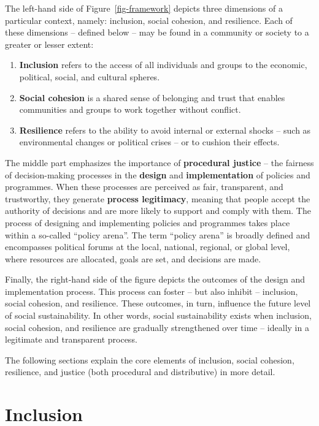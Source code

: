 \documentclass[
  a4paper,
  DIV=11,
  numbers=noendperiod,
  oneside,
  openany]{scrreprt}
\begin{document}
The left-hand side of Figure~\ref{fig-framework} depicts three
dimensions of a particular context, namely: inclusion, social cohesion,
and resilience. Each of these dimensions -- defined below -- may be
found in a community or society to a greater or lesser extent:

\begin{enumerate}
\def\labelenumi{\arabic{enumi}.}
\item
  \textbf{Inclusion} refers to the access of all individuals and groups
  to the economic, political, social, and cultural spheres.
\item
  \textbf{Social cohesion} is a shared sense of belonging and trust that
  enables communities and groups to work together without conflict.
\item
  \textbf{Resilience} refers to the ability to avoid internal or
  external shocks -- such as environmental changes or political crises
  -- or to cushion their effects.
\end{enumerate}

The middle part emphasizes the importance of \textbf{procedural justice}
-- the fairness of decision-making processes in the \textbf{design} and
\textbf{implementation} of policies and programmes. When these processes
are perceived as fair, transparent, and trustworthy, they generate
\textbf{process legitimacy}, meaning that people accept the authority of
decisions and are more likely to support and comply with them. The
process of designing and implementing policies and programmes takes
place within a so-called ``policy arena''. The term ``policy arena'' is
broadly defined and encompasses political forums at the local, national,
regional, or global level, where resources are allocated, goals are set,
and decisions are made.

Finally, the right-hand side of the figure depicts the outcomes of the
design and implementation process. This process can foster -- but also
inhibit -- inclusion, social cohesion, and resilience. These outcomes,
in turn, influence the future level of social sustainability. In other
words, social sustainability exists when inclusion, social cohesion, and
resilience are gradually strengthened over time -- ideally in a
legitimate and transparent process.

The following sections explain the core elements of inclusion, social
cohesion, resilience, and justice (both procedural and distributive) in
more detail.

\section{Inclusion}\label{inclusion}
\end{document}
